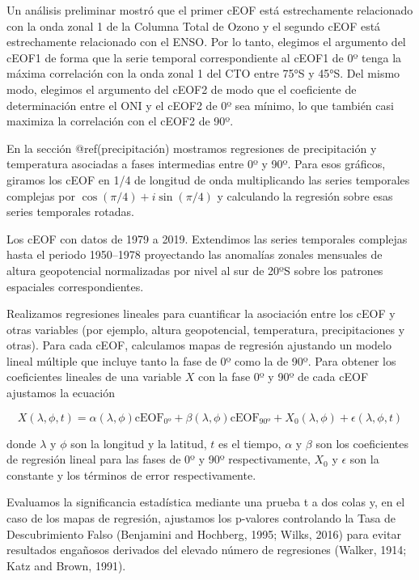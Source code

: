 \documentclass[12pt,oneside]{reedthesis}
\begin{document}
Un análisis preliminar mostró que el primer cEOF está estrechamente relacionado con la onda zonal 1 de la Columna Total de Ozono y el segundo cEOF está estrechamente relacionado con el ENSO.
Por lo tanto, elegimos el argumento del cEOF1 de forma que la serie temporal correspondiente al cEOF1 de 0º tenga la máxima correlación con la onda zonal 1 del CTO entre 75°S y 45°S.
Del mismo modo, elegimos el argumento del cEOF2 de modo que el coeficiente de determinación entre el ONI y el cEOF2 de 0º sea mínimo, lo que también casi maximiza la correlación con el cEOF2 de 90º.

En la sección @ref(precipitación) mostramos regresiones de precipitación y temperatura asociadas a fases intermedias entre 0º y 90º.
Para esos gráficos, giramos los cEOF en 1/4 de longitud de onda multiplicando las series temporales complejas por \(\cos(\pi/4) + i\sin(\pi/4)\) y calculando la regresión sobre esas series temporales rotadas.

Los cEOF con datos de 1979 a 2019.
Extendimos las series temporales complejas hasta el periodo 1950--1978 proyectando las anomalías zonales mensuales de altura geopotencial normalizadas por nivel al sur de 20ºS sobre los patrones espaciales correspondientes.

Realizamos regresiones lineales para cuantificar la asociación entre los cEOF y otras variables (por ejemplo, altura geopotencial, temperatura, precipitaciones y otras).
Para cada cEOF, calculamos mapas de regresión ajustando un modelo lineal múltiple que incluye tanto la fase de 0º como la de 90º.
Para obtener los coeficientes lineales de una variable \(X\) con la fase 0º y 90º de cada cEOF ajustamos la ecuación

\begin{equation}
X(\lambda, \phi, t) = \alpha(\lambda, \phi) \operatorname{cEOF_{0º}} + \beta(\lambda, \phi) \operatorname{cEOF_{90º}} + X_0(\lambda, \phi) + \epsilon(\lambda, \phi, t)
 \label{eq:multiple-regression}
\end{equation}

donde \(\lambda\) y \(\phi\) son la longitud y la latitud, \(t\) es el tiempo, \(\alpha\) y \(\beta\) son los coeficientes de regresión lineal para las fases de 0º y 90º respectivamente, \(X_0\) y \(\epsilon\) son la constante y los términos de error respectivamente.

Evaluamos la significancia estadística mediante una prueba t a dos colas y, en el caso de los mapas de regresión, ajustamos los p-valores controlando la Tasa de Descubrimiento Falso (Benjamini and Hochberg, 1995; Wilks, 2016) para evitar resultados engañosos derivados del elevado número de regresiones (Walker, 1914; Katz and Brown, 1991).
\end{document}
